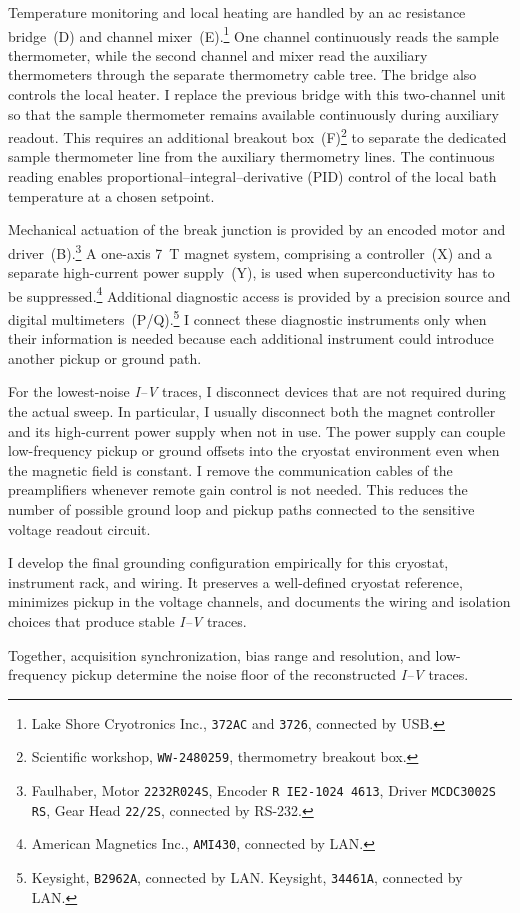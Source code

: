         Temperature monitoring and local heating are handled by an ac resistance bridge~(D) and channel mixer~(E).\footnote{Lake Shore Cryotronics Inc., \texttt{372AC} and \texttt{3726}, connected by USB.} One channel continuously reads the sample thermometer, while the second channel and mixer read the auxiliary thermometers through the separate thermometry cable tree. The bridge also controls the local heater. I replace the previous bridge with this two-channel unit so that the sample thermometer remains available continuously during auxiliary readout. This requires an additional breakout box~(F)\footnote{Scientific workshop, \texttt{WW-2480259}, thermometry breakout box.} to separate the dedicated sample thermometer line from the auxiliary thermometry lines. The continuous reading enables proportional--integral--derivative (PID) control of the local bath temperature at a chosen setpoint.

        Mechanical actuation of the break junction is provided by an encoded motor and driver~(B).\footnote{Faulhaber, Motor \texttt{2232R024S}, Encoder \texttt{R IE2-1024 4613}, Driver \texttt{MCDC3002S RS}, Gear Head \texttt{22/2S}, connected by RS-232.} A one-axis \qty{7}{\tesla} magnet system, comprising a controller~(X) and a separate high-current power supply~(Y), is used when superconductivity has to be suppressed.\footnote{American Magnetics Inc., \texttt{AMI430}, connected by LAN.} Additional diagnostic access is provided by a precision source and digital multimeters~(P/Q).\footnote{Keysight, \texttt{B2962A}, connected by LAN. Keysight, \texttt{34461A}, connected by LAN.} I connect these diagnostic instruments only when their information is needed because each additional instrument could introduce another pickup or ground path.

        For the lowest-noise \textit{I--V} traces, I disconnect devices that are not required during the actual sweep. In particular, I usually disconnect both the magnet controller and its high-current power supply when not in use. The power supply can couple low-frequency pickup or ground offsets into the cryostat environment even when the magnetic field is constant. I remove the communication cables of the preamplifiers whenever remote gain control is not needed. This reduces the number of possible ground loop and pickup paths connected to the sensitive voltage readout circuit.

        I develop the final grounding configuration empirically for this cryostat, instrument rack, and wiring. It preserves a well-defined cryostat reference, minimizes pickup in the voltage channels, and documents the wiring and isolation choices that produce stable \textit{I--V} traces.

        Together, acquisition synchronization, bias range and resolution, and low-frequency pickup determine the noise floor of the reconstructed \textit{I--V} traces.
